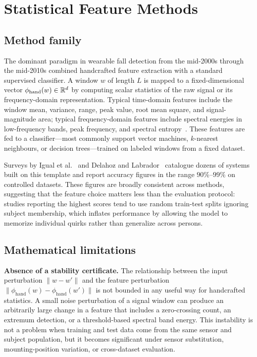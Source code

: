 \section{Statistical Feature Methods}
\label{subsec:rw-statistical}

\subsection{Method family}

The dominant paradigm in wearable fall detection from the mid-2000s through the
mid-2010s combined handcrafted feature extraction with a standard supervised
classifier.  A window $w$ of length $L$ is mapped to a fixed-dimensional vector
$\phi_{\mathrm{hand}}(w)\in\mathbb{R}^d$ by computing scalar statistics of the raw signal
or its frequency-domain representation.  Typical time-domain features include the
window mean, variance, range, peak value, root mean square, and signal-magnitude
area; typical frequency-domain features include spectral energies in low-frequency
bands, peak frequency, and spectral entropy~\parencite{igual2013challenges,
delahoz2014survey}.  These features are fed to a classifier---most commonly
support vector machines, $k$-nearest neighbours, or decision trees---trained on
labeled windows from a fixed dataset.

Surveys by Igual et al.~\parencite{igual2013challenges} and Delahoz and
Labrador~\parencite{delahoz2014survey} catalogue dozens of systems built on this
template and report accuracy figures in the range $90\%$--$99\%$ on controlled
datasets.  These figures are broadly consistent across methods, suggesting that
the feature choice matters less than the evaluation protocol: studies reporting
the highest scores tend to use random train-test splits ignoring subject membership,
which inflates performance by allowing the model to memorize individual quirks
rather than generalize across persons.

\subsection{Mathematical limitations}

\textbf{Absence of a stability certificate.}  The relationship between the
input perturbation $\|w - w'\|$ and the feature perturbation
$\|\phi_{\mathrm{hand}}(w) - \phi_{\mathrm{hand}}(w')\|$ is not bounded in any
useful way for handcrafted statistics.  A small noise perturbation of a signal
window can produce an arbitrarily large change in a feature that includes a
zero-crossing count, an extremum detection, or a threshold-based spectral band
energy.  This instability is not a problem when training and test data come from
the same sensor and subject population, but it becomes significant under sensor
substitution, mounting-position variation, or cross-dataset evaluation.

